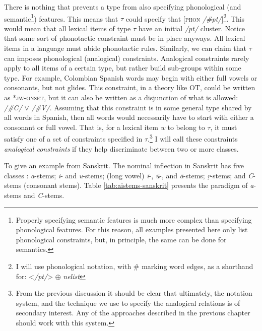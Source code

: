 There is nothing that prevents a type from also specifying phonological (and semantic\footnote{Properly specifying semantic features is much more complex than specifying phonological features. For this reason, all examples presented here only list phonological constraints, but, in principle, the same can be done for semantics.}) features. This means that $\tau$ could specify that [\textsc{phon} \textit{/\#pt/}]\footnote{I will use phonological notation, with \# marking word edges, as a shorthand for: <\textit{/pt/}> $\oplus$ \textit{nelist}}. This would mean that all lexical items of type $\tau$ have an initial \textit{/pt/} cluster. Notice that some sort of phonotactic constraint must be in place anyways. All lexical items in a language must abide phonotactic rules. Similarly, we can claim that $\tau$ can imposes phonological (analogical) constraints. Analogical constraints rarely apply to all items of a certain type, but rather build sub-groups within some type. For example, Colombian Spanish words may begin with either full vowels or consonants, but not glides. This constraint, in a theory like OT, could be written as *\textsc{jw-onset}, but it can also be written as a disjunction of what is allowed: \textit{/\#C/} $\lor$ \textit{/\#V/}. Assuming that this constraint is in some general type shared by all words in Spanish, then all words would necessarily have to start with either a consonant or full vowel. That is, for a lexical item \textit{w} to belong to $\tau$, it must satisfy one of a set of constraints specified in $\tau$.\footnote{From the previous discussion it should be clear that ultimately, the notation system, and the technique we use to specify the analogical relations is of secondary interest. Any of the approaches described in the previous chapter should work with this system.} I will call these constraints \textit{analogical constraints} if they help discriminate between two or more classes.

To give an example from Sanskrit. The nominal inflection in Sanskrit has five classes \autocite{Whitney.1986}: \textit{a}-stems; \textit{i}- and \textit{u}-stems; (long vowel) \textit{ī}-, \textit{ū}-, and \textit{ā}-stems; \textit{ṛ}-stems; and \textit{C}-stems (consonant stems). Table \ref{tab:aistems-sanskrit} presents the paradigm of \textit{a}-stems and \textit{C}-stems.


